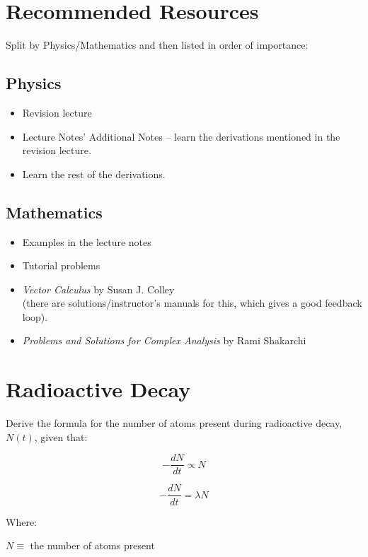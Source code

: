 \documentclass{article}
\begin{document}
\clearpage
\section{Recommended Resources}
Split by Physics/Mathematics and then listed in order of importance:
\subsection{Physics}
\begin{itemize}
  \item Revision lecture
  \item Lecture Notes' Additional Notes -- learn the derivations mentioned in
    the revision lecture. 
  \item Learn the rest of the derivations. 
\end{itemize}
\subsection{Mathematics}
\begin{itemize}
  \item Examples in the lecture notes
  \item Tutorial problems
  \item \textit{Vector Calculus} by Susan J. Colley \\
    (there are solutions/instructor's manuals for this, which gives a good 
    feedback loop).
  \item \textit{Problems and Solutions for Complex Analysis} by Rami Shakarchi
\end{itemize}

\clearpage
\section{Radioactive Decay}
Derive the formula for the number of atoms present during radioactive decay, 
$N(t)$, given that:

\begin{equation}
  - \frac{dN}{dt} \propto N
\end{equation}

\begin{equation}
  - \frac{dN}{dt} = \lambda N
\end{equation}

Where:

$N \equiv$ the number of atoms present
\end{document}
